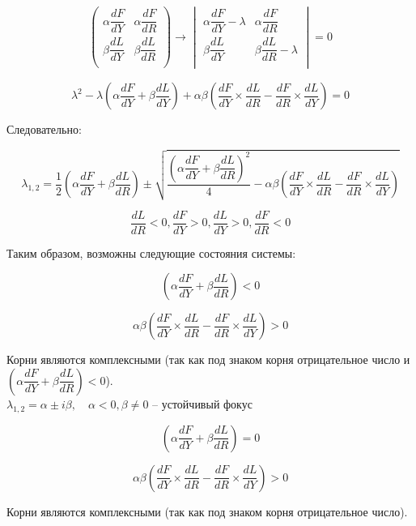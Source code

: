 \begin{align*}
	\begin{pmatrix}
		\alpha \dfrac{dF}{dY} & \alpha \dfrac{dF}{dR}\\[10pt]
		\beta \dfrac{dL}{dY} & \beta \dfrac{dL}{dR}\\
	\end{pmatrix}
	\longrightarrow
	\begin{vmatrix}
		\alpha \dfrac{dF}{dY} - \lambda & \alpha \dfrac{dF}{dR}\\[10pt]
		\beta \dfrac{dL}{dY} & \beta \dfrac{dL}{dR} - \lambda\\
	\end{vmatrix}
	= 0
\end{align*}

\newpage

\[ \lambda^2 - \lambda \left(\alpha \dfrac{dF}{dY} + \beta \dfrac{dL}{dY}\right) + \alpha \beta \left(\dfrac{dF}{dY} \times \dfrac{dL}{dR} - \dfrac{dF}{dR} \times \dfrac{dL}{dY} \right) = 0 \]

Следовательно:

\[ \lambda_{1,2} = \dfrac{1}{2} \left(\alpha \dfrac{dF}{dY} + \beta \dfrac{dL}{dR} \right) \pm \sqrt{\dfrac{\left(\alpha \dfrac{dF}{dY} + \beta \dfrac{dL}{dR} \right)^2}{4} - \alpha \beta \left(\dfrac{dF}{dY} \times \dfrac{dL}{dR} - \dfrac{dF}{dR} \times \dfrac{dL}{dY} \right)} \]

\[ \dfrac{dL}{dR} < 0,  \dfrac{dF}{dY} > 0, \dfrac{dL}{dY} > 0, \dfrac{dF}{dR} < 0 \]

Таким образом, возможны следующие состояния системы:

\[ \left(\alpha \dfrac{dF}{dY} + \beta \dfrac{dL}{dR} \right) < 0 \]

\[ \alpha \beta \left(\dfrac{dF}{dY} \times \dfrac{dL}{dR} - \dfrac{dF}{dR} \times \dfrac{dL}{dY} \right) > 0 \]

Корни являются комплексными (так как под знаком корня отрицательное число и $\left(\alpha \dfrac{dF}{dY} + \beta \dfrac{dL}{dR} \right) < 0$).\\

$ \lambda_{1,2} = \alpha \pm i \beta, \quad \alpha < 0, \beta \neq 0 $ -- устойчивый фокус

\[ \left(\alpha \dfrac{dF}{dY} + \beta \dfrac{dL}{dR} \right) = 0 \]

\[ \alpha \beta \left(\dfrac{dF}{dY} \times \dfrac{dL}{dR} - \dfrac{dF}{dR} \times \dfrac{dL}{dY} \right) > 0 \]

Корни являются комплексными (так как под знаком корня отрицательное число).\\

